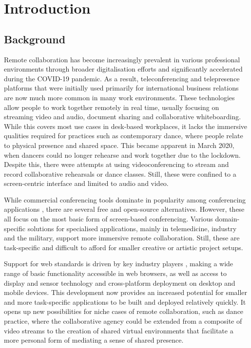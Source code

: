 \chapter{Introduction}
\label{chapter:introduction}

\section{Background}

Remote collaboration has become increasingly prevalent in various professional environments through broader digitalisation efforts and significantly accelerated during the COVID-19 pandemic.
As a result, teleconferencing and telepresence platforms that were initially used primarily for international business relations are now much more common in many work environments.
These technologies allow people to work together remotely in real time, usually focusing on streaming video and audio, document sharing and collaborative whiteboarding.
While this covers most use cases in desk-based workplaces, it lacks the immersive qualities required for practices such as contemporary dance, where people relate to physical presence and shared space.
This became apparent in March 2020, when dancers could no longer rehearse and work together due to the lockdown.
Despite this, there were attempts at using videoconferencing to stream and record collaborative rehearsals or dance classes.
Still, these were confined to a screen-centric interface and limited to audio and video.

While commercial conferencing tools dominate in popularity among conferencing applications \parencite{mostPopularConferencingPlatforms}, there are several free and open-source alternatives.
However, these all focus on the most basic form of screen-based conferencing.
Various domain-specific solutions for specialised applications, mainly in telemedicine, industry and the military, support more immersive remote collaboration. Still, these are task-specific and difficult to afford for smaller creative or artistic project setups.

Support for web standards is driven by key industry players \parencite{pushingInteroperabilityForward}, making a wide range of basic functionality accessible in web browsers, as well as access to display and sensor technology and cross-platform deployment on desktop and mobile devices.
This development now provides an increased potential for smaller and more task-specific applications to be built and deployed relatively quickly.
It opens up new possibilities for niche cases of remote collaboration, such as dance practice, where the collaborative agency could be extended from a composite of video streams to the creation of shared virtual environments that facilitate a more personal form of mediating a sense of shared presence.


